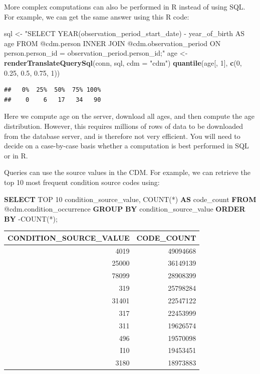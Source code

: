 \documentclass[11pt]{book}
\newenvironment{Shaded}{\begin{snugshade}}{\end{snugshade}}
\newcommand{\KeywordTok}[1]{\textcolor[rgb]{0.13,0.29,0.53}{\textbf{#1}}}
\newcommand{\DataTypeTok}[1]{\textcolor[rgb]{0.13,0.29,0.53}{#1}}
\newcommand{\DecValTok}[1]{\textcolor[rgb]{0.00,0.00,0.81}{#1}}
\newcommand{\FloatTok}[1]{\textcolor[rgb]{0.00,0.00,0.81}{#1}}
\newcommand{\StringTok}[1]{\textcolor[rgb]{0.31,0.60,0.02}{#1}}
\newcommand{\FunctionTok}[1]{\textcolor[rgb]{0.00,0.00,0.00}{#1}}
\newcommand{\NormalTok}[1]{#1}
\theoremstyle{definition}
\theoremstyle{definition}
\theoremstyle{definition}
\theoremstyle{remark}
\begin{document}
More complex computations can also be performed in R instead of using
SQL. For example, we can get the same answer using this R code:

\begin{Shaded}
\begin{Highlighting}[]
\NormalTok{sql <-}\StringTok{ "SELECT YEAR(observation_period_start_date) -}
\StringTok{               year_of_birth AS age}
\StringTok{FROM @cdm.person}
\StringTok{INNER JOIN @cdm.observation_period}
\StringTok{  ON person.person_id = observation_period.person_id;"}
\NormalTok{age <-}\StringTok{ }\KeywordTok{renderTranslateQuerySql}\NormalTok{(conn, sql, }\DataTypeTok{cdm =} \StringTok{"cdm"}\NormalTok{)}
\KeywordTok{quantile}\NormalTok{(age[, }\DecValTok{1}\NormalTok{], }\KeywordTok{c}\NormalTok{(}\DecValTok{0}\NormalTok{, }\FloatTok{0.25}\NormalTok{, }\FloatTok{0.5}\NormalTok{, }\FloatTok{0.75}\NormalTok{, }\DecValTok{1}\NormalTok{))}
\end{Highlighting}
\end{Shaded}

\begin{verbatim}
##   0%  25%  50%  75% 100% 
##    0    6   17   34   90
\end{verbatim}

Here we compute age on the server, download all ages, and then compute
the age distribution. However, this requires millions of rows of data to
be downloaded from the database server, and is therefore not very
efficient. You will need to decide on a case-by-case basis whether a
computation is best performed in SQL or in R.

Queries can use the source values in the CDM. For example, we can
retrieve the top 10 most frequent condition source codes using:

\begin{Shaded}
\begin{Highlighting}[]
\KeywordTok{SELECT}\NormalTok{ TOP }\DecValTok{10}\NormalTok{ condition_source_value, }
  \FunctionTok{COUNT}\NormalTok{(*) }\KeywordTok{AS}\NormalTok{ code_count}
\KeywordTok{FROM}\NormalTok{ @cdm.condition_occurrence}
\KeywordTok{GROUP} \KeywordTok{BY}\NormalTok{ condition_source_value}
\KeywordTok{ORDER} \KeywordTok{BY}\NormalTok{ -COUNT(*);}
\end{Highlighting}
\end{Shaded}

\begin{longtable}[]{@{}rr@{}}
\toprule
CONDITION\_SOURCE\_VALUE & CODE\_COUNT\tabularnewline
\midrule
\endhead
4019 & 49094668\tabularnewline
25000 & 36149139\tabularnewline
78099 & 28908399\tabularnewline
319 & 25798284\tabularnewline
31401 & 22547122\tabularnewline
317 & 22453999\tabularnewline
311 & 19626574\tabularnewline
496 & 19570098\tabularnewline
I10 & 19453451\tabularnewline
3180 & 18973883\tabularnewline
\bottomrule
\end{longtable}
\end{document}
